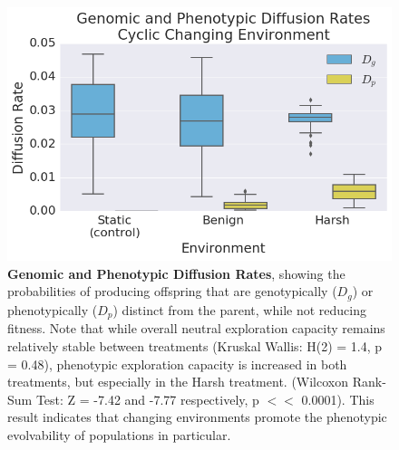 \documentclass[PhD]{msu-thesis}
\begin{document}

	\begin{figure}[!h] %
	\includegraphics[trim={0.2cm 0 0.4cm 0.25cm},clip,width=0.75\columnwidth]{figures/CE/CCE_D_g_D_p__box.png}
	\caption{\textbf{Genomic and Phenotypic Diffusion Rates}, showing the probabilities of producing offspring that are genotypically ($D_g$) or phenotypically ($D_p$) distinct from the parent, while not reducing fitness.
	Note that while overall neutral exploration capacity remains relatively stable between treatments (Kruskal Wallis: H(2) = 1.4, p = 0.48), phenotypic exploration capacity is increased in both treatments, but especially in the Harsh treatment. (Wilcoxon Rank-Sum Test: Z = -7.42 and -7.77 respectively, p $<<$ 0.0001). This result indicates that changing environments promote the phenotypic evolvability of populations in particular.
	}\label{fig:CCE_diffusion_rate}
	\end{figure}
\end{document}
